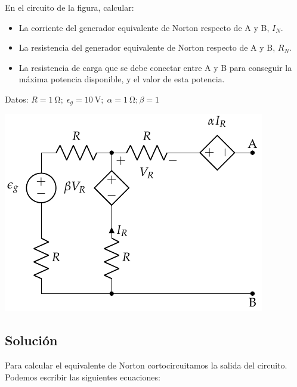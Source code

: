 En el circuito de la figura, calcular:
\begin{itemize}
\item La corriente del generador equivalente de Norton respecto de A y
  B, $I_N$.
\item La resistencia del generador equivalente de Norton respecto de A
  y B, $R_N$.
\item La resistencia de carga que se debe conectar entre A y B para
  conseguir la máxima potencia disponible, y el valor de esta
  potencia.
\end{itemize}

Datos: $R = \qty{1}{\ohm};\; \epsilon_g = \qty{10}{\volt};\; \alpha = \qty{1}{\ohm}; \beta = 1$

\begin{center}
  \includegraphics{figuras/norton.pdf}
\end{center}

\subsection*{Solución}
Para calcular el equivalente de Norton cortocircuitamos la salida del circuito. Podemos escribir las siguientes ecuaciones:

